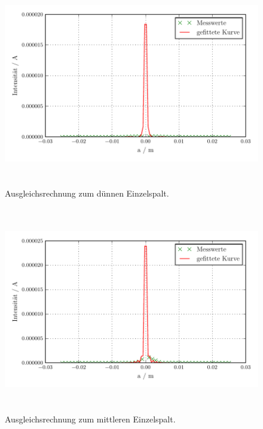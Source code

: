 \begin{figure}[H] %
  \centering
  \includegraphics[height=9cm]{build/plot1.pdf}
  \caption{Ausgleichsrechnung zum dünnen Einzelspalt.}
  \label{fig:Einzel1}
\end{figure}

\begin{figure}[H] %
  \centering
  \includegraphics[height=9cm]{build/plot2.pdf}
  \caption{Ausgleichsrechnung zum mittleren Einzelspalt.}
  \label{fig:Einzel2}
\end{figure}

